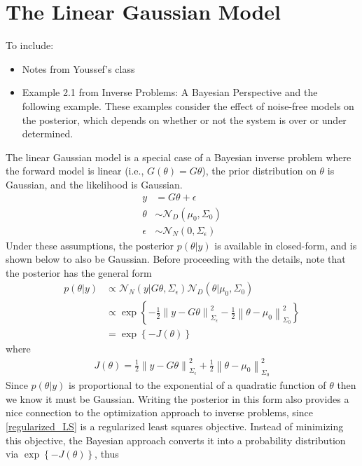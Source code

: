 \documentclass[12pt]{article}
\newcommand*{\norm}[1]{\left\lVert#1\right\rVert}
\begin{document}
\section{The Linear Gaussian Model}
To include: 
\begin{itemize}
\item Notes from Youssef's class
\item Example 2.1 from Inverse Problems: A Bayesian Perspective and the following example. These examples consider the effect of noise-free models on the posterior, which depends on whether or not the system is over or under determined. 
\end{itemize}

The linear Gaussian model is a special case of a Bayesian inverse problem where the forward model is linear (i.e., $G(\theta) = G\theta$), the prior distribution on $\theta$ is Gaussian, and the likelihood is Gaussian. 
\begin{align}
y &= G\theta + \epsilon \label{linear_Gaussian} \\
\theta &\sim \mathcal{N}_D(\mu_0, \Sigma_0) \nonumber \\
\epsilon &\sim \mathcal{N}_N(0, \Sigma_\epsilon) \nonumber
\end{align}
Under these assumptions, the posterior $p(\theta|y)$ is available in closed-form, and is shown below to also be Gaussian. Before proceeding with the details, note that the posterior has the general form 
\begin{align*}
p(\theta|y) &\propto \mathcal{N}_N(y|G\theta, \Sigma_\epsilon)\mathcal{N}_D(\theta|\mu_0, \Sigma_0) \\
		&\propto \exp\left\{-\frac{1}{2} \norm{y - G\theta}^2_{\Sigma_\epsilon} - \frac{1}{2} \norm{\theta - \mu_0}^2_{\Sigma_0} \right\} \\
		&= \exp\left\{-J(\theta) \right\}
\end{align*}
where 
\begin{align} 
J(\theta) = \frac{1}{2} \norm{y - G\theta}^2_{\Sigma_\epsilon} + \frac{1}{2} \norm{\theta - \mu_0}^2_{\Sigma_0} \label{regularized_LS}
\end{align}
Since $p(\theta|y)$ is proportional to the exponential of a quadratic function of $\theta$ then we know it must be Gaussian. Writing the posterior in this form also provides a nice connection to the optimization approach to 
inverse problems, since \ref{regularized_LS} is a regularized least squares objective. Instead of minimizing this objective, the Bayesian approach converts it into a probability distribution via $\exp\left\{-J(\theta) \right\}$, thus 
\end{document}
